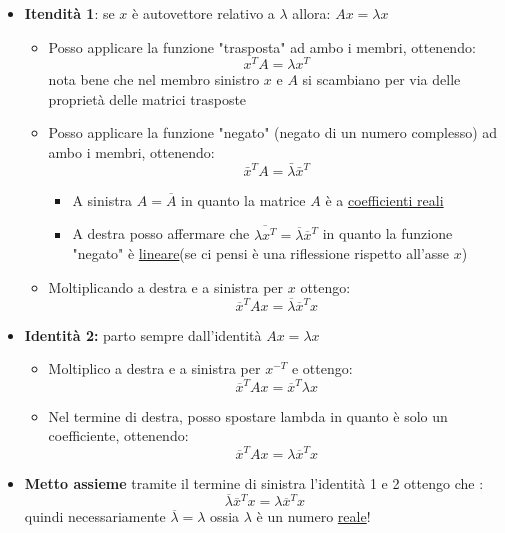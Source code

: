 \begin{itemize}
	\item \textbf{Itendità 1}: se $ x $ è autovettore relativo a $ \lambda  $ allora:  $ Ax = \lambda x$
	      \begin{itemize}
		      \item Posso applicare la funzione "trasposta" ad ambo i membri, ottenendo:
		            \[
			            x^{T} A = \lambda  x^{T}
		            \]
		            nota bene che nel membro sinistro $ x $ e $ A $ si scambiano per via delle proprietà delle matrici trasposte
		      \item Posso applicare la funzione "negato" (negato di un numero complesso) ad ambo i membri, ottenendo:
		            \[
			            \bar{x}^T A = \bar{\lambda} \bar{x}^T
		            \]
		            \begin{itemize}
			            \item A sinistra $ A = \overline{A} $ in quanto la matrice $ A $ è a \underline{coefficienti reali}
			            \item A destra posso affermare che $ \overline{\lambda  x ^{T}} = \overline{\lambda }\overline{x}^{T} $ in quanto la funzione "negato" è \underline{lineare}(se ci pensi è una riflessione rispetto all'asse $ x $)
		            \end{itemize}
		      \item Moltiplicando a destra e a sinistra per $ x $ ottengo:
		            \begin{equation*}
			            \overline{x}^{T}Ax = \overline{\lambda }\overline{x}^{T}x
		            \end{equation*}
	      \end{itemize}
	\item \textbf{Identità 2:} parto sempre dall'identità  $ Ax = \lambda x $
	      \begin{itemize}
		      \item Moltiplico a destra e a sinistra per $ x^{-T} $ e ottengo:
		            \[
			            \overline{x}^{T}Ax = \overline{x}^{T}\lambda x
		            \]
		      \item Nel termine di destra, posso spostare lambda in quanto è solo un coefficiente, ottenendo:
		            \begin{equation*}
			            \overline{x}^{T}Ax = \lambda \overline{x}^{T} x
		            \end{equation*}
	      \end{itemize}
	\item \textbf{Metto assieme} tramite il termine di sinistra l'identità 1 e 2 ottengo che :
	      \[
		      \overline{\lambda }\overline{x}^{T}x = \lambda \overline{x}^{T}x
	      \]
	      quindi necessariamente $ \overline{\lambda } = \lambda  $ ossia $ \lambda  $ è un numero \underline{reale}!
\end{itemize}
